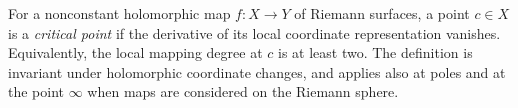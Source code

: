
For a nonconstant holomorphic map $f:X\to Y$ of Riemann surfaces, a point $c\in X$ is a \emph{critical point} if the derivative of its local coordinate representation vanishes. Equivalently, the local mapping degree at $c$ is at least two. The definition is invariant under holomorphic coordinate changes, and applies also at poles and at the point $\infty$ when maps are considered on the Riemann sphere.
